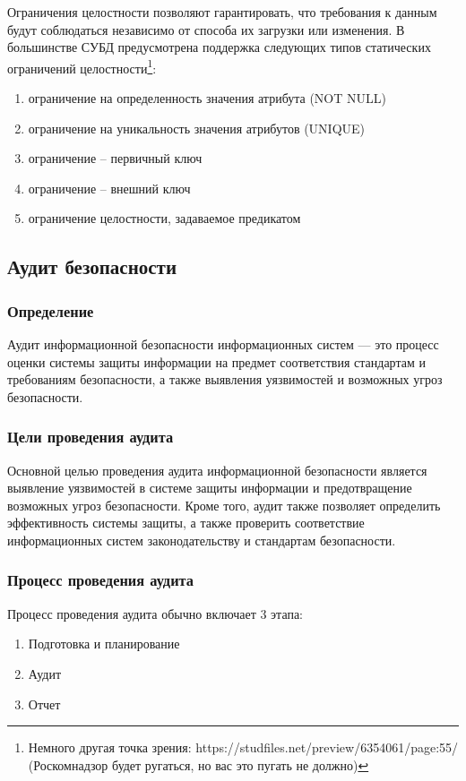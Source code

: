 Ограничения целостности позволяют гарантировать, что требования к данным будут соблюдаться независимо от способа их загрузки или изменения. В большинстве СУБД предусмотрена поддержка следующих типов статических ограничений целостности\footnote{Немного другая точка зрения: https://studfiles.net/preview/6354061/page:55/ (Роскомнадзор будет ругаться, но вас это пугать не должно)}:
\begin{enumerate}
	\item ограничение на определенность значения атрибута (NOT NULL)
	\item ограничение на уникальность значения атрибутов (UNIQUE)
	\item ограничение -- первичный ключ
	\item ограничение -- внешний ключ
	\item ограничение целостности, задаваемое предикатом
\end{enumerate}

\subsection{Аудит безопасности}

\subsubsection{Определение}

Аудит информационной безопасности информационных систем — это процесс оценки системы защиты информации на предмет соответствия стандартам и требованиям безопасности, а также выявления уязвимостей и возможных угроз безопасности.

\subsubsection{Цели проведения аудита}

Основной целью проведения аудита информационной безопасности является выявление уязвимостей в системе защиты информации и предотвращение возможных угроз безопасности. Кроме того, аудит также позволяет определить эффективность системы защиты, а также проверить соответствие информационных систем законодательству и стандартам безопасности.

\subsubsection{Процесс проведения аудита}

Процесс проведения аудита обычно включает 3 этапа:
\begin{enumerate}
	\item Подготовка и планирование
	\item Аудит
	\item Отчет
\end{enumerate}

